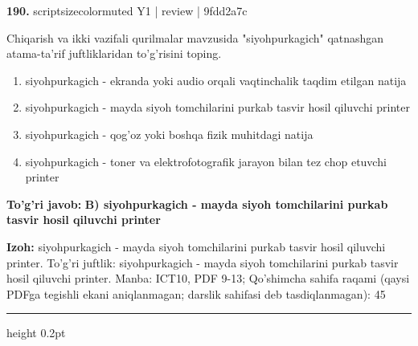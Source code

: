 \documentclass[10pt,a4paper]{article}
\begin{document}
{\bfseries\sffamily\color{ink} 190.} {scriptsizecolor{muted} Y1 | review | 9fdd2a7c}
\par
Chiqarish va ikki vazifali qurilmalar mavzusida "siyohpurkagich" qatnashgan atama-ta'rif juftliklaridan to'g'risini toping.
\begin{enumerate}[label=\Alph*),leftmargin=9mm]
\item siyohpurkagich - ekranda yoki audio orqali vaqtinchalik taqdim etilgan natija
\item siyohpurkagich - mayda siyoh tomchilarini purkab tasvir hosil qiluvchi printer
\item siyohpurkagich - qog'oz yoki boshqa fizik muhitdagi natija
\item siyohpurkagich - toner va elektrofotografik jarayon bilan tez chop etuvchi printer
\end{enumerate}
\begin{tcolorbox}[enhanced,breakable,colback=teal!4,colframe=teal!60!black,boxrule=0.45pt,arc=1.2mm,left=2.7mm,right=2.7mm,top=1.8mm,bottom=1.8mm,before skip=2mm,after skip=2mm]
{\bfseries\sffamily\color{teal}To'g'ri javob:} \textbf{B) siyohpurkagich - mayda siyoh tomchilarini purkab tasvir hosil qiluvchi printer}
\par\smallskip
{\bfseries Izoh:} siyohpurkagich - mayda siyoh tomchilarini purkab tasvir hosil qiluvchi printer. To'g'ri juftlik: siyohpurkagich - mayda siyoh tomchilarini purkab tasvir hosil qiluvchi printer. Manba: ICT10, PDF 9-13; Qo'shimcha sahifa raqami (qaysi PDFga tegishli ekani aniqlanmagan; darslik sahifasi deb tasdiqlanmagan): 45
\end{tcolorbox}
\vspace{2mm}\hrule height 0.2pt\vspace{3mm}
\end{document}
